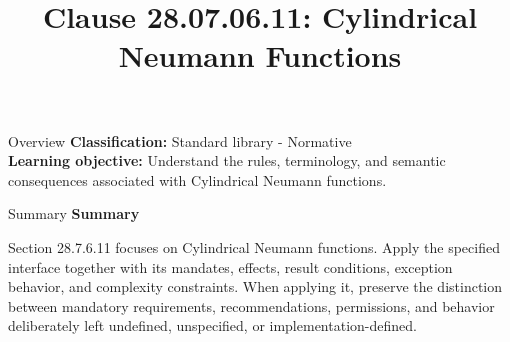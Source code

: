 \documentclass[10pt,letterpaper]{article}
\title{Clause 28.07.06.11: Cylindrical Neumann Functions}
\author{}
\date{}
\begin{document}
\maketitle
\begin{CornellOverviewBox}{Overview}
\textbf{Classification:} Standard library - Normative\\[2pt]
\textbf{Learning objective:} Understand the rules, terminology, and semantic consequences associated with Cylindrical Neumann functions.
\end{CornellOverviewBox}\begin{CornellSummaryBox}{Summary}
{\sffamily\bfseries\color{Accent} Summary}\par\vspace{3pt}Section 28.7.6.11 focuses on Cylindrical Neumann functions. Apply the specified interface together with its mandates, effects, result conditions, exception behavior, and complexity constraints. When applying it, preserve the distinction between mandatory requirements, recommendations, permissions, and behavior deliberately left undefined, unspecified, or implementation-defined.
\end{CornellSummaryBox}
\end{document}
